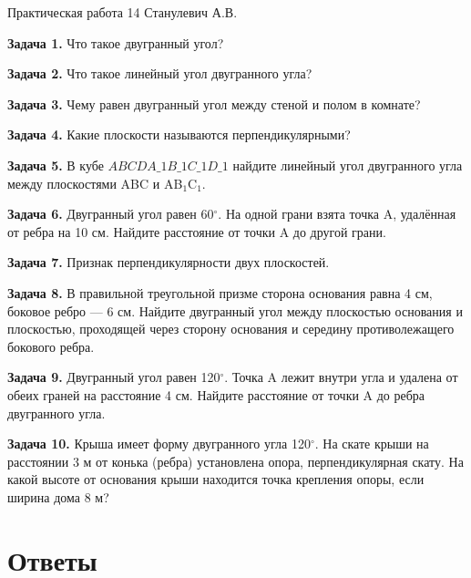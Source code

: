\documentclass{umk-matematika}
\begin{document}
\maketitlepage
    {Практическая работа 14}
    {}
    {Станулевич А.В.}

\textbf{Задача 1.} Что такое двугранный угол?\par\vspace{10pt}
\textbf{Задача 2.} Что такое линейный угол двугранного угла?\par\vspace{10pt}
\textbf{Задача 3.} Чему равен двугранный угол между стеной и полом в комнате?\par\vspace{10pt}
\textbf{Задача 4.} Какие плоскости называются перпендикулярными?\par\vspace{10pt}
\textbf{Задача 5.} В кубе $ABCDA\_1B\_1C\_1D\_1$ найдите линейный угол двугранного угла между плоскостями ABC и AB$_1$C$_1$.\par\vspace{10pt}
\textbf{Задача 6.} Двугранный угол равен 60$^\circ$. На одной грани взята точка A, удалённая от ребра на 10 см. Найдите расстояние от точки A до другой грани.\par\vspace{10pt}
\textbf{Задача 7.} Признак перпендикулярности двух плоскостей.\par\vspace{10pt}
\textbf{Задача 8.} В правильной треугольной призме сторона основания равна 4 см, боковое ребро — 6 см. Найдите двугранный угол между плоскостью основания и плоскостью, проходящей через сторону основания и середину противолежащего бокового ребра.\par\vspace{10pt}
\textbf{Задача 9.} Двугранный угол равен 120$^\circ$. Точка A лежит внутри угла и удалена от обеих граней на расстояние 4 см. Найдите расстояние от точки A до ребра двугранного угла.\par\vspace{10pt}
\textbf{Задача 10.} Крыша имеет форму двугранного угла 120$^\circ$. На скате крыши на расстоянии 3 м от конька (ребра) установлена опора, перпендикулярная скату. На какой высоте от основания крыши находится точка крепления опоры, если ширина дома 8 м?\par\vspace{10pt}
\newpage
\section*{Ответы}
\end{document}
